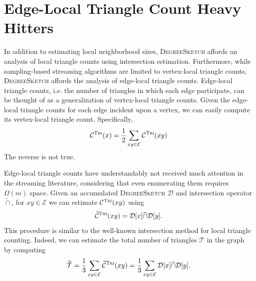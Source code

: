 \documentclass{report}
\newcommand{\algoname}[1]{\textnormal{\textsc{#1}}}
\begin{document}
\section{Edge-Local Triangle Count Heavy Hitters}
 \label{DS:sec:edge_triangles}

In addition to estimating local neighborhood sizes, \algoname{DegreeSketch} affords an analysis of local triangle counts using intersection estimation. 
Furthermore, while sampling-based streaming algorithms are limited to vertex-local triangle counts, \algoname{DegreeSketch} affords the analysis of edge-local triangle counts. 
Edge-local triangle counts, i.e. the number of triangles in which each edge participate, can be thought of as a generalization of vertex-local triangle counts. 
Given the edge-local triangle counts for each edge incident upon a vertex, we can easily compute its vertex-local triangle count.
Specifically,
%
\begin{equation} \label{eq:sum_of_edge_tris}
	\mathcal{C}^\algoname{Tri}(x) 
	= \frac{1}{2}\sum\limits_{xy \in \mathcal{E}} \mathcal{C}^\algoname{Tri}(xy)
\end{equation}
%
The reverse is not true. 

Edge-local triangle counts have understandably not received much attention in the streaming literature, considering that even enumerating them requires $\Omega(m)$ space. 
Given an accumulated \algoname{DegreeSketch} $\mathcal{D}$ and intersection operator $\widetilde{\cap}$, for $xy \in \mathcal{E}$ we can estimate $\mathcal{C}^{\algoname{Tri}}(xy)$ using 
%
\begin{equation} \label{eq:tri:edge}
	\widetilde{\mathcal{C}}^{\algoname{Tri}}(xy) 
	= \mathcal{D}[x] \widetilde{\cap} \mathcal{D}[y].
\end{equation}
%
This procedure is similar to the well-known intersection method for local triangle counting. 
Indeed, we can estimate the total number of triangles $\mathcal{T}$ in the graph by computing
%
\begin{equation} \label{eq:tri:total}
	\widetilde{\mathcal{T}} 
	= \frac{1}{3} \sum\limits_{xy \in \mathcal{E}} 	\widetilde{\mathcal{C}}^{\algoname{Tri}}(xy) 
	= \frac{1}{3} \sum\limits_{xy \in \mathcal{E}} \mathcal{D}[x] \widetilde{\cap} \mathcal{D}[y].
\end{equation}
%
\end{document}
